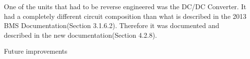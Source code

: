One of the units that had to be reverse engineered was the DC/DC Converter. It had a completely different circuit composition than what is described in the 2013 BMS Documentation\cite{BMSDocumentation}(Section 3.1.6.2). Therefore it was documented and described in the new documentation\cite{AU2}(Section 4.2.8). 

Future improvements